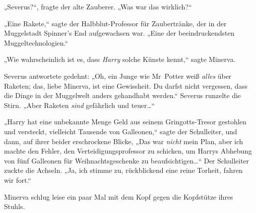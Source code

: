 „Severus?“, fragte der alte Zauberer. „Was war das wirklich?“

„Eine Rakete,“ sagte der Halbblut-Professor für Zaubertränke, der in der Muggelstadt Spinner’s End aufgewachsen war. „Eine der beeindruckendsten Muggeltechnologien.“

„Wie wahrscheinlich ist es, dass \emph{Harry} solche Künste kennt,“ sagte Minerva.

Severus antwortete gedehnt: „Oh, ein Junge wie Mr~Potter weiß \emph{alles} über Raketen; das, liebe Minerva, ist eine Gewissheit. Du darfst nicht vergessen, dass die Dinge in der Muggelwelt anders gehandhabt werden.“ Severus runzelte die Stirn. „Aber Raketen \emph{sind} gefährlich und teuer…“

„Harry hat eine unbekannte Menge Geld aus seinem Gringotts-Tresor gestohlen und versteckt, vielleicht Tausende von Galleonen,“ sagte der Schulleiter, und dann, auf ihrer beider erschrockene Blicke, „Das war \emph{nicht} mein Plan, aber ich machte den Fehler, den Verteidigungsprofessor zu schicken, um Harrys Abhebung von fünf Galleonen für Weihnachtsgeschenke zu beaufsichtigen…“ Der Schulleiter zuckte die Achseln. „Ja, ich stimme zu, rückblickend eine reine Torheit, fahren wir fort.“

Minerva schlug leise ein paar Mal mit dem Kopf gegen die Kopfstütze ihres Stuhls.

